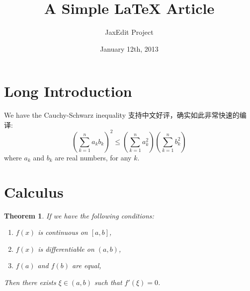 \documentclass{article}
\newtheorem{thm}{Theorem}[section]
\begin{document}
\title{A Simple LaTeX Article}
\author{JaxEdit Project}
\date{January 12th, 2013}
\maketitle

\tableofcontents

\section[Introduction]{Long Introduction}

We have the Cauchy-Schwarz inequality 支持中文好评，确实如此非常快速的编译:
  \[ \left( \sum_{k=1}^n a_k b_k \right)^2 \leq \left( \sum_{k=1}^n a_k^2 \right) \left( \sum_{k=1}^n b_k^2 \right) \]
where $a_k$ and $b_k$ are real numbers, for any $k$.

\section{Calculus}

\begin{thm}
If we have the following conditions:
\begin{enumerate}
\item $f(x)$ is continuous on $[a,b]$,
\item $f(x)$ is differentiable on $(a,b)$,
\item $f(a)$ and $f(b)$ are equal,
\end{enumerate}
Then there exists $\xi\in(a,b)$ such that $f'(\xi)=0$.
\end{thm}
\end{document}
